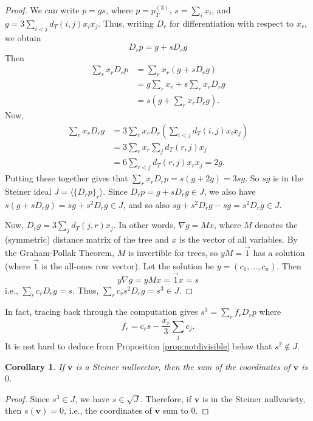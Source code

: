 \documentclass{article}
\newcommand{\bv}{\mathbf{v}}
\newtheorem{cor}[theorem]{Corollary}
\begin{document}
\begin{proof}
We can write $p=gs$, where $p = p^{(3)}_T$, $s = \sum_{i} x_i$, and $g = 3 \sum_{i < j} d_T(i,j) x_i x_j$.  Thus, writing $D_r$ for differentiation with respect to $x_r$, we obtain
$$
D_r p = g + s D_r g
$$ 
Then
\begin{align*}
\sum_r x_r D_r p &= \sum_r x_r (g + s D_r g) \\
&= g \sum_r x_r + s \sum_r x_r D_r g \\
&= s(g + \sum_r x_r D_r g).
\end{align*}
Now, 
\begin{align*}
    \sum_r x_r D_r g &= 3 \sum_r x_r D_r \left (\sum_{i < j} d_T(i,j) x_i x_j \right )\\
    &= 3 \sum_r x_r \sum_{j} d_T(r,j) x_j \\    
    &= 6 \sum_{r < j} d_T(r,j) x_r x_j  = 2g.    
\end{align*}
Putting these together gives that $\sum_r x_r D_r p = s(g + 2g) = 3sg$.  So $sg$ is in the Steiner ideal $J = \langle \{D_r p\}_{r} \rangle$.  Since $D_r p = g+  sD_r g \in J$, we also have $s(g+s D_r g) = sg+s^2 D_r g \in J$, and so also $sg+s^2 D_r g-sg = s^2 D_r g \in J$.  

Now, $D_r g = 3 \sum_j d_T(j,r) x_j$.  In other words, $\nabla g = M x$, where $M$ denotes the (symmetric) distance matrix of the tree and $x$ is the vector of all variables.  By the Graham-Pollak Theorem, $M$ is invertible for trees, so $y M = \vec{1}$ has a solution (where $\vec{1}$ is the all-ones row vector).  Let the solution be $y=(c_1,\ldots,c_n)$.  Then
$$ 
y \nabla g = y M x = \vec{1} x = s
$$
i.e., $\sum_r c_r D_r g = s$.  Thus, $\sum_r c_r s^2 D_r g = s^3 \in J$.
\end{proof}

In fact, tracing back through the computation gives $s^3 = \sum_r f_r D_r p$ where
$$
f_r = c_r s - \frac{x_r}{3} \sum_j c_j.
$$
It is not hard to deduce from Proposition \ref{prop:notdivisible} below that $s^2 \not \in J$.

\begin{cor}\label{zerosum} If $\bv$ is a Steiner nullvector, then the sum of the coordinates of $\bv$ is $0$.
\end{cor}
\begin{proof} Since $s^3 \in J$, we have $s \in \sqrt{J}$.  Therefore, if $\bv$ is in the Steiner nullvariety, then $s(\bv) = 0$, i.e., the coordinates of $\bv$ sum to $0$.
\end{proof}
\end{document}
